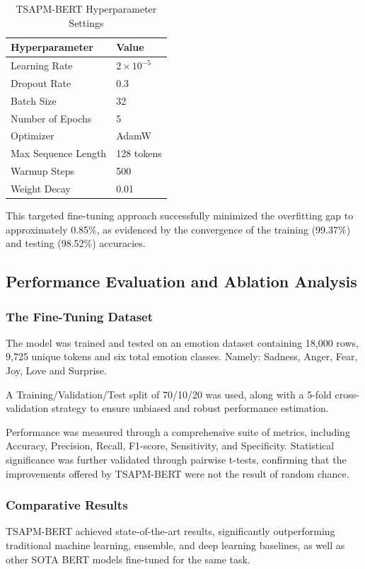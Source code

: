 \documentclass[a4paper,12pt]{article}
\begin{document}
\begin{table}[H]
\centering
\caption{TSAPM-BERT Hyperparameter Settings}
\label{tab:hyperparameters}
\begin{tabular}{|l|l|}
\hline
\textbf{Hyperparameter} & \textbf{Value} \\ \hline
Learning Rate           & $2 \times 10^{-5}$ \\ \hline
Dropout Rate            & 0.3 \\ \hline
Batch Size              & 32 \\ \hline
Number of Epochs        & 5 \\ \hline
Optimizer               & AdamW  \\ \hline
Max Sequence Length     & 128 tokens  \\ \hline
Warmup Steps            & 500  \\ \hline
Weight Decay            & 0.01  \\ \hline
\end{tabular}
\end{table}

This targeted fine-tuning approach successfully minimized the overfitting gap to approximately 0.85\%, as evidenced by the convergence of the training (99.37\%) and testing (98.52\%) accuracies.

\subsection{Performance Evaluation and Ablation Analysis}

\subsubsection{The Fine-Tuning Dataset}
The model was trained and tested on an emotion dataset containing 18,000 rows, 9,725 unique tokens and six total emotion classes. Namely: Sadness, Anger, Fear, Joy, Love and Surprise. 

A Training/Validation/Test split of 70/10/20 was used, along with a 5-fold cross-validation strategy to ensure unbiased and robust performance estimation.

Performance was measured through a comprehensive suite of metrics, including Accuracy, Precision, Recall, F1-score, Sensitivity, and Specificity. Statistical significance was further validated through pairwise t-tests, confirming that the improvements offered by TSAPM-BERT were not the result of random chance.

\subsubsection{Comparative Results}
TSAPM-BERT achieved state-of-the-art results, significantly outperforming traditional machine learning, ensemble, and deep learning baselines, as well as other SOTA BERT models fine-tuned for the same task.
\end{document}
